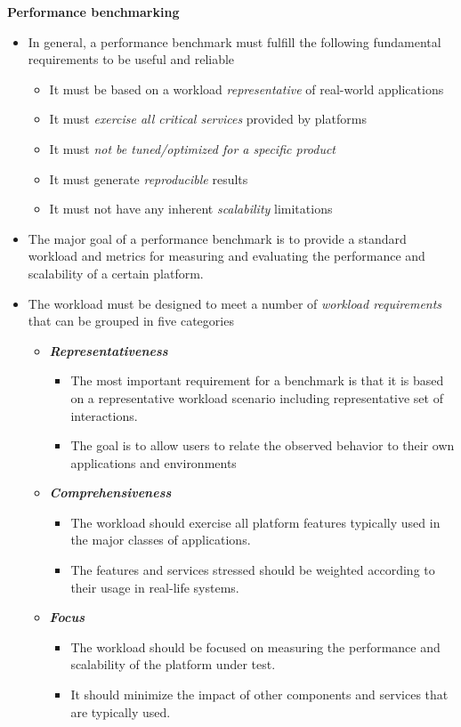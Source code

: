 \textbf{Performance benchmarking}
\begin{itemize}
  \item In general, a performance benchmark must fulfill the following fundamental requirements to be useful and reliable
  \begin{itemize}
  	\item It must be based on a workload \textit{representative} of real-world applications
  	\item It must \textit{exercise all critical services} provided by platforms
  	\item It must \textit{not be tuned/optimized for a specific product}
  	\item It must generate \textit{reproducible} results
  	\item It must not have any inherent \textit{scalability} limitations  
  \end{itemize}
  \item The major goal of a performance benchmark is to provide a standard workload and metrics for measuring and evaluating the performance and scalability of a certain platform.
  \item The workload must be designed to meet a number of \textit{workload requirements} that can be grouped in five categories
  \begin{itemize}
  	\item \textit{\textbf{Representativeness}}
  	\begin{itemize}
  		\item The most important requirement for a benchmark is that it is based on a representative workload scenario including representative set of interactions.
  		\item The goal is to allow users to relate the observed behavior to their own applications and environments
    \end{itemize}

  	\item \textbf{\textit{Comprehensiveness}}
	\begin{itemize}
  		\item The workload should exercise all platform features typically used in the major classes of applications.
  		\item The features and services stressed should be weighted according to their usage in real-life systems.
	\end{itemize}

  	\item \textbf{\textit{Focus}}
  	\begin{itemize}
  		\item The workload should be focused on measuring the performance and scalability of the platform under test. 
  		\item It should minimize the impact of other components and services that are typically used.
	\end{itemize}


\end{itemize}
\end{itemize}
